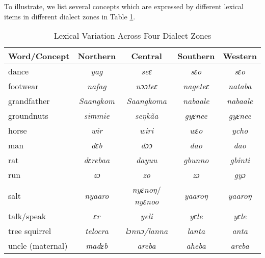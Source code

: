 \begin{refsection}
To illustrate, we list several concepts which are expressed by different lexical items in different dialect zones in Table \ref{tab:dialects}.

\begin{table}
    \centering
    \begin{tabular}{lcccc}\\
    Word/Concept & Northern & Central & Southern & Western \\\hline
    dance    &\textit{ yag} &\textit{seɛ}  & \textit{ sɛo}&\textit{sɛo} \\
    footwear    &\textit{ nafag} &\textit{nɔɔteɛ}  & \textit{nageteɛ}&\textit{ nataba} \\
    grandfather    &\textit{ Saangkom} &\textit{ Saangkoma}  & \textit{ nabaale}&\textit{ nabaale} \\
    groundnuts    &\textit{ simmie} &\textit{seŋkãa}& \textit{ gyɛnee}&\textit{ gyɛnee} \\
    horse    &\textit{ wir} &\textit{ wiri}  & \textit{ wɛo}&\textit{ ycho} \\
    man    &\textit{dɛb} &\textit{dɔɔ}  & \textit{dao}&\textit{dao} \\
    rat    &\textit{ dɛrebaa} &\textit{dayuu}  & \textit{ gbunno}&\textit{ gbinti} \\
    run    &\textit{zɔ} &\textit{zo}  & \textit{zɔ}&\textit{gyɔ} \\
    salt  & \textit{ nyaaro} &  \textit{ nyɛnoŋ}/\textit{ nyɛnoo}& \textit{yaaroŋ}     & \textit{yaaroŋ}  \\
    talk/speak    &\textit{ ɛr} &\textit{yeli}  & \textit{yɛle}&\textit{yɛle} \\
    tree squirrel    &\textit{ telocra} &\textit{ lɔnnɔ/lanna}  & \textit{ lanta}&\textit{ anta} \\
    uncle (maternal)    &\textit{ madɛb} &\textit{ areba}  & \textit{ aheba}&\textit{ areba} \\


    \end{tabular}
    \caption{Lexical Variation Across Four Dialect Zones}
    \label{tab:dialects}
\end{table}

    
    
     

   




\end{refsection}
